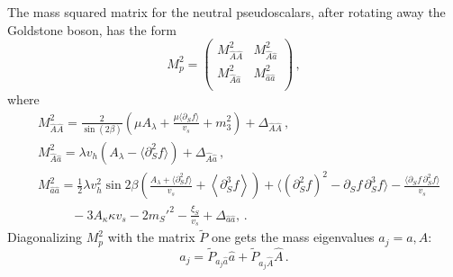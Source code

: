 \documentclass[12pt,twoside]{article}
\def\pa{\partial}
\def\hataa{\hat{a}\hat{a}}
\def\hatAa{\hat{A}\hat{a}}
\def\hatAA{\hat{A}\hat{A}}
\begin{document}
The mass squared matrix for the neutral pseudoscalars, after rotating 
away the Goldstone boson, has the form
%
\begin{equation}
\label{M_p^2}
 {M}_p^2=
\left(
\begin{array}{cc}
   {M}^2_{\hatAA} & {M}^2_{\hatAa} \\[4pt]
   {M}^2_{\hatAa} & {M}^2_{\hataa} \\
\end{array}
\right) \,,
\end{equation}
%
where
%
\begin{align}
\label{MAA}
&{M}^2_{\hatAA} 
=
\frac{2}{\sin\left(2\beta\right)}
\left(\mu A_{\lambda} + 
\frac{\mu\langle\pa_S f\rangle}{v_s}
+m_3^2\right)+\Delta_{\hatAA}
\,, \\
\label{MAa}
&{M}^2_{\hatAa} 
= 
{\lambda v_h}  \left(A_{\lambda} - \langle\pa_S^2 f\rangle\right) 
+ \Delta_{\hatAa}
\,, \\
\label{Maa}
&{M}^2_{\hataa} 
= 
\frac12 \lambda v_h^2 \sin2\beta
\left(\frac{A_{\lambda}+\langle\pa_S^2 f\rangle}{v_s}
+\left<\partial^3_Sf\right>\right)
+\langle(\partial_S^2f)^2 - \partial_S f\,\partial_S^3 f\rangle
-\frac{\langle\partial_S f\,\partial_S^2 f\rangle}{v_s}
\nonumber\\ &\hspace{32pt}
-3A_\kappa\kappa v_s - 2m_S'^2-\frac{\xi_S}{v_s}
+ \Delta_{\hataa},
\,. 
\end{align}
%
Diagonalizing $M_p^2$ with the matrix $\tilde{P}$ 
one gets the mass eigenvalues
$a_j=a,A$:
\begin{equation}
\label{tildeP}
a_j=\tilde{P}_{{a_j}\hat{a}}\hat{a}+\tilde{P}_{{a_j}\hat{A}}\hat{A}
\,.
\end{equation}
\end{document}
